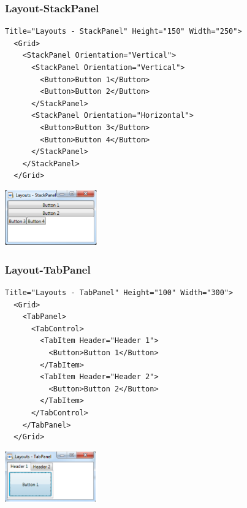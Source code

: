 \subsubsection{Layout-StackPanel}
\begin{minipage}{14cm}
\begin{lstlisting}[style=CSharp]
  Title="Layouts - StackPanel" Height="150" Width="250">
  <Grid>
    <StackPanel Orientation="Vertical">
      <StackPanel Orientation="Vertical">
        <Button>Button 1</Button>
        <Button>Button 2</Button>
      </StackPanel>
      <StackPanel Orientation="Horizontal">
        <Button>Button 3</Button>
        <Button>Button 4</Button>
      </StackPanel>
    </StackPanel>
  </Grid>
\end{lstlisting}
\end{minipage}
\begin{minipage}{4cm}
  \includegraphics[width=4cm]{images/XAML/StackPanel}
\end{minipage}

\subsubsection{Layout-TabPanel}
\begin{minipage}{14cm}
\begin{lstlisting}[style=CSharp]
  Title="Layouts - TabPanel" Height="100" Width="300">
  <Grid>
    <TabPanel>
      <TabControl>
        <TabItem Header="Header 1">
          <Button>Button 1</Button>
        </TabItem>
        <TabItem Header="Header 2">
          <Button>Button 2</Button>
        </TabItem>
      </TabControl>
    </TabPanel>
  </Grid>
\end{lstlisting}
\end{minipage}
\begin{minipage}{4cm}
  \includegraphics[width=4cm]{images/XAML/TabPanel}
\end{minipage}

